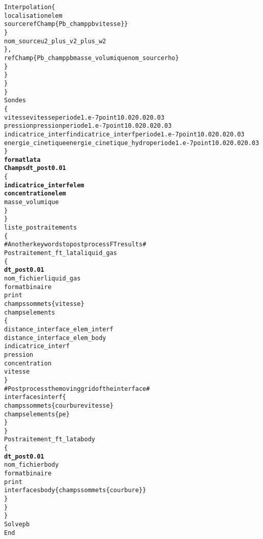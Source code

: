 \begin{alltt}
                                Interpolation \{
                                    localisation elem
                                    source refChamp \{ Pb_champ pb vitesse \} \}
                            \}
                            nom_source u2_plus_v2_plus_w2
                        \} ,
                        refChamp \{ Pb_champ pb masse_volumique nom_source rho \}
                    \}
                \}
            \}
        \}
        Sondes 
        \{
            vitesse vitesse periode 1.e-7 point 1 0.02 0.02 0.03
            pression pression periode 1.e-7 point 1 0.02 0.02 0.03
            indicatrice_interf indicatrice_interf periode 1.e-7 point 1 0.02 0.02 0.03
            energie_cinetique energie_cinetique_hydro periode 1.e-7 point 1 0.02 0.02 0.03
        \}
        {\bf{format lata}}
        {\bf{Champs dt_post 0.01 }}
        \{
            {\bf{indicatrice_interf elem}}
            {\bf{concentration elem}}
            masse_volumique
        \}
    \}
    liste_postraitements
    \{
        # Another keywords to post process FT results #
        Postraitement_ft_lata liquid_gas
        \{
            {\bf{dt_post 0.01 }}
            nom_fichier liquid_gas
            format binaire
            print
            champs sommets \{ vitesse \}
            champs elements
            \{
                distance_interface_elem_interf
                distance_interface_elem_body
                indicatrice_interf
                pression
                concentration
                vitesse
            \}
            # Post process the moving grid of the interface #
            interfaces interf \{
                champs sommets \{ courbure vitesse \}
                champs elements \{ pe \}
            \}
        \}
        Postraitement_ft_lata body
        \{
            {\bf{dt_post 0.01 }}
            nom_fichier body
            format binaire
            print
            interfaces body \{ champs sommets \{ courbure \} \}
        \}
    \}
\}
Solve pb
End
\end{alltt}
